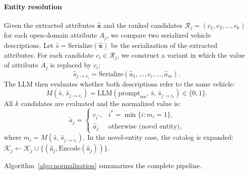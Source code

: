 \documentclass[conference]{IEEEtran}
\begin{document}
\paragraph{Entity resolution}
Given the extracted attributes $\hat{\mathbf{x}}$ and the ranked
candidates $\mathcal{R}_j = (c_1, c_2, \dots, c_k)$ for each
open-domain attribute $A_j$, we compare two serialized vehicle
descriptions. Let $\hat{s} = \text{Serialize}(\hat{\mathbf{x}})$
be the serialization of the extracted attributes. For each candidate
$c_i \in \mathcal{R}_j$, we construct a variant in which the value of
attribute $A_j$ is replaced by $c_i$:
\begin{equation}
\hat{s}_{j \to c_i} = \text{Serialize}(\hat{a}_1, \dots, c_i, \dots, \hat{a}_m).
\end{equation}
The LLM then evaluates whether both descriptions refer to the same
vehicle:
\begin{equation}
M(\hat{s},\, \hat{s}_{j \to c_i}) =
\text{LLM}(\text{prompt}_{\text{res}},\, \hat{s},\,
\hat{s}_{j \to c_i}) \in \{0, 1\}.
\end{equation}
All $k$ candidates are evaluated and the normalized value is:
\begin{equation}
\tilde{a}_j =
\begin{cases}
c_{i^*}, & i^* = \min\{i : m_i = 1\}, \\[4pt]
\hat{a}_j & \text{otherwise (novel entity),}
\end{cases}
\end{equation}
where $m_i = M(\hat{s},\, \hat{s}_{j \to c_i})$.
In the novel-entity case, the catalog is expanded:
$\mathcal{K}_j \leftarrow \mathcal{K}_j \cup
\{(\hat{a}_j, \text{Encode}(\hat{a}_j))\}$.

Algorithm~\ref{algo:normalization} summarizes the complete pipeline.
\end{document}
